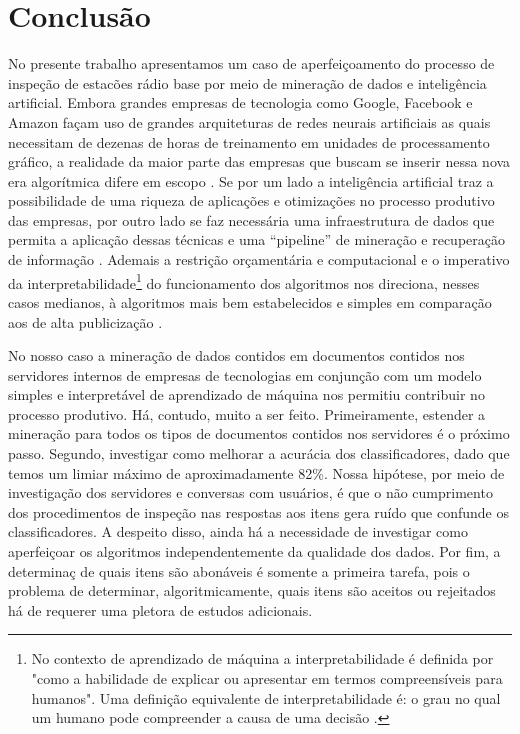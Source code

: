 \documentclass[
	12pt,				%
	openany,			%
	oneside,			%
	a4paper,			%
	english,			%
	french,				%
	spanish,			%
	brazil,				%
	]{abntex2}
\begin{document}
\chapter*[Conclusão]{Conclusão}

No presente trabalho apresentamos um caso de aperfei\c{c}oamento do processo de
inspe\c{c}ão de esta{c}ões rádio base por meio de minera\c{c}ão de dados e
inteligência artificial. Embora grandes empresas de tecnologia como Google,
Facebook e Amazon façam uso de grandes arquiteturas de redes neurais artificiais
as quais necessitam de dezenas de horas de treinamento em unidades de
processamento gráfico, a realidade da maior parte das empresas que buscam se
inserir nessa nova era algorítmica difere em escopo \cite{canziani2016analysis}.
Se por um lado a inteligência artificial traz a possibilidade de uma riqueza de
aplicações e otimizações no processo produtivo das empresas, por outro lado se
faz necessária uma infraestrutura de dados que permita a aplicação dessas
técnicas e uma ``pipeline'' de mineração e recuperação de informação
\cite{schutze2007introduction}. Ademais a restrição orçamentária e computacional
e o imperativo da interpretabilidade\footnote{No contexto de aprendizado de
  máquina a interpretabilidade é definida por 
  "como a habilidade de explicar ou apresentar em termos compreensíveis para
  humanos". Uma definição equivalente de interpretabilidade é: o grau no qual um
  humano pode compreender a causa de uma decisão \cite{miller2018explanation}.}
do funcionamento dos algoritmos nos direciona, nesses casos medianos, à
algoritmos mais bem estabelecidos e simples em comparação aos de alta
publicização \cite{dreiseitl2002logistic}.

No nosso caso a minera\c{c}ão de dados contidos em documentos contidos nos
servidores internos de empresas de tecnologias em conjun\c{c}ão com um modelo
simples e interpretável de aprendizado de máquina nos permitiu contribuir no
processo produtivo. Há, contudo, muito a ser feito. Primeiramente, estender a
minera\c{c}ão para todos os tipos de documentos contidos nos servidores é o
próximo passo. Segundo, investigar como melhorar a acurácia dos classificadores,
dado que temos um limiar máximo de aproximadamente 82\%. Nossa hipótese, por
meio de investiga\c{c}ão dos servidores e conversas com usuários, é que o não
cumprimento dos procedimentos de inspe\c{c}ão nas respostas aos itens gera ruído
que confunde os classificadores. A despeito disso, ainda há a necessidade de
investigar como aperfei\c{c}oar os algoritmos independentemente da qualidade dos
dados. Por fim, a determina\c{c} de quais itens são abonáveis é somente a
primeira tarefa, pois o problema de determinar, algoritmicamente, quais itens
são aceitos ou rejeitados há de requerer uma pletora de estudos adicionais.
\end{document}
